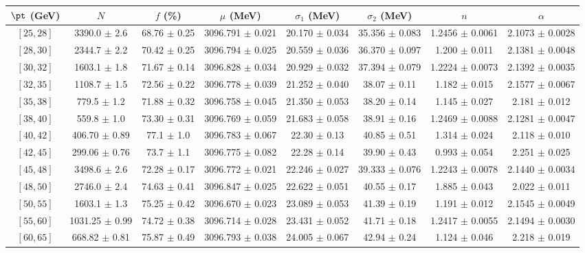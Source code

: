 \begin{tabular}{c||c|c|c|c|c|c|c}
$\pt$ (GeV) & $N$ & $f$ (\%) & $\mu$ (MeV) & $\sigma_1$ (MeV) & $\sigma_2$ (MeV) & $n$ & $\alpha$ \\
\hline
$[25, 28]$ & 3390.0 $\pm$ 2.6 & 68.76 $\pm$ 0.25 & 3096.791 $\pm$ 0.021 & 20.170 $\pm$ 0.034 & 35.356 $\pm$ 0.083 & 1.2456 $\pm$ 0.0061 & 2.1073 $\pm$ 0.0028\\
$[28, 30]$ & 2344.7 $\pm$ 2.2 & 70.42 $\pm$ 0.25 & 3096.794 $\pm$ 0.025 & 20.559 $\pm$ 0.036 & 36.370 $\pm$ 0.097 & 1.200 $\pm$ 0.011 & 2.1381 $\pm$ 0.0048\\
$[30, 32]$ & 1603.1 $\pm$ 1.8 & 71.67 $\pm$ 0.14 & 3096.828 $\pm$ 0.034 & 20.929 $\pm$ 0.032 & 37.394 $\pm$ 0.079 & 1.2224 $\pm$ 0.0073 & 2.1392 $\pm$ 0.0035\\
$[32, 35]$ & 1108.7 $\pm$ 1.5 & 72.56 $\pm$ 0.22 & 3096.778 $\pm$ 0.039 & 21.252 $\pm$ 0.040 & 38.07 $\pm$ 0.11 & 1.182 $\pm$ 0.015 & 2.1577 $\pm$ 0.0067\\
$[35, 38]$ & 779.5 $\pm$ 1.2 & 71.88 $\pm$ 0.32 & 3096.758 $\pm$ 0.045 & 21.350 $\pm$ 0.053 & 38.20 $\pm$ 0.14 & 1.145 $\pm$ 0.027 & 2.181 $\pm$ 0.012\\
$[38, 40]$ & 559.8 $\pm$ 1.0 & 73.30 $\pm$ 0.31 & 3096.769 $\pm$ 0.059 & 21.683 $\pm$ 0.058 & 38.91 $\pm$ 0.16 & 1.2469 $\pm$ 0.0088 & 2.1281 $\pm$ 0.0047\\
$[40, 42]$ & 406.70 $\pm$ 0.89 & 77.1 $\pm$ 1.0 & 3096.783 $\pm$ 0.067 & 22.30 $\pm$ 0.13 & 40.85 $\pm$ 0.51 & 1.314 $\pm$ 0.024 & 2.118 $\pm$ 0.010\\
$[42, 45]$ & 299.06 $\pm$ 0.76 & 73.7 $\pm$ 1.1 & 3096.775 $\pm$ 0.082 & 22.28 $\pm$ 0.14 & 39.90 $\pm$ 0.43 & 0.993 $\pm$ 0.054 & 2.251 $\pm$ 0.025\\
$[45, 48]$ & 3498.6 $\pm$ 2.6 & 72.28 $\pm$ 0.17 & 3096.772 $\pm$ 0.021 & 22.246 $\pm$ 0.027 & 39.333 $\pm$ 0.076 & 1.2243 $\pm$ 0.0078 & 2.1440 $\pm$ 0.0034\\
$[48, 50]$ & 2746.0 $\pm$ 2.4 & 74.63 $\pm$ 0.41 & 3096.847 $\pm$ 0.025 & 22.622 $\pm$ 0.051 & 40.55 $\pm$ 0.17 & 1.885 $\pm$ 0.043 & 2.022 $\pm$ 0.011\\
$[50, 55]$ & 1603.1 $\pm$ 1.3 & 75.25 $\pm$ 0.42 & 3096.670 $\pm$ 0.023 & 23.089 $\pm$ 0.053 & 41.39 $\pm$ 0.19 & 1.191 $\pm$ 0.012 & 2.1545 $\pm$ 0.0049\\
$[55, 60]$ & 1031.25 $\pm$ 0.99 & 74.72 $\pm$ 0.38 & 3096.714 $\pm$ 0.028 & 23.431 $\pm$ 0.052 & 41.71 $\pm$ 0.18 & 1.2417 $\pm$ 0.0055 & 2.1494 $\pm$ 0.0030\\
$[60, 65]$ & 668.82 $\pm$ 0.81 & 75.87 $\pm$ 0.49 & 3096.793 $\pm$ 0.038 & 24.005 $\pm$ 0.067 & 42.94 $\pm$ 0.24 & 1.124 $\pm$ 0.046 & 2.218 $\pm$ 0.019\\

\end{tabular}
